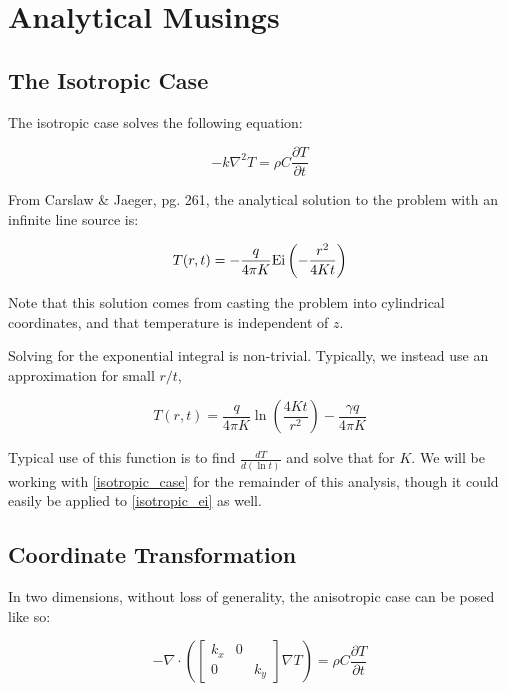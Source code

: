 \chapter{Analytical Musings}
\section{The Isotropic Case}

The isotropic case solves the following equation:

\begin{equation*}
-k\nabla^2 T = \rho C\frac{\partial T}{\partial t}
\end{equation*}

From Carslaw \& Jaeger, pg. 261, the analytical solution to the problem with an infinite line source is:

\begin{equation}
\label{isotropic_ei}
T(r,t) = - \frac{q}{4\pi K}\textrm{Ei}\left(-\frac{r^2}{4Kt}\right)
\end{equation}

Note that this solution comes from casting the problem into cylindrical coordinates, and that temperature is independent of \(z\).

Solving for the exponential integral is non-trivial.  Typically, we instead use an approximation for small \(r/t\),

\begin{equation}
\label{isotropic_case}
T(r,t) = \frac{q}{4\pi K}\ln\left(\frac{4Kt}{r^2}\right) - \frac{\gamma q}{4\pi K}
\end{equation}

Typical use of this function is to find \(\frac{dT}{d(\ln t)}\) and solve that for \(K\). We will be working with \ref{isotropic_case} for the remainder of this analysis, though it could easily be applied to \ref{isotropic_ei} as well.

\section{Coordinate Transformation}

In two dimensions, without loss of generality, the anisotropic case can be posed like so:

\begin{equation}
-\nabla \cdot \left(\begin{bmatrix}k_x & 0\\ 0 && k_y\end{bmatrix}\nabla T \right)= \rho C\frac{\partial T}{\partial t}
\end{equation}

